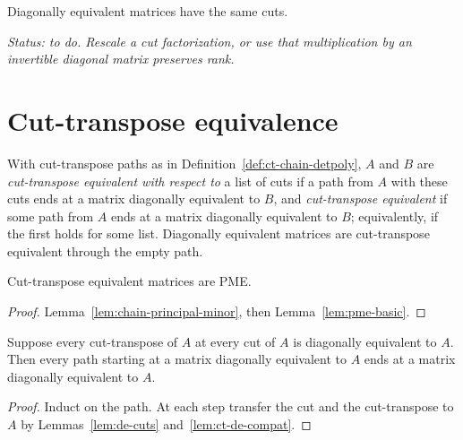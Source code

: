 \begin{lemma}
\label{lem:de-cuts}
\leanok
{}
Diagonally equivalent matrices have the same cuts.
\end{lemma}
\noindent\emph{Status: to do. Rescale a cut factorization, or use that multiplication by an
invertible diagonal matrix preserves rank.}

\section{Cut-transpose equivalence}

\begin{definition}
\label{def:ct-chain}
\leanok
{}
With cut-transpose paths as in Definition~\ref{def:ct-chain-detpoly}, $A$ and $B$ are
\emph{cut-transpose equivalent with respect to} a list of cuts if a path from $A$ with these
cuts ends at a matrix diagonally equivalent to $B$, and \emph{cut-transpose equivalent} if
some path from $A$ ends at a matrix diagonally equivalent to $B$; equivalently, if the first
holds for some list. Diagonally equivalent matrices are cut-transpose equivalent through the
empty path.
\end{definition}

\begin{lemma}
\label{lem:chain-pme}
\leanok
{}
Cut-transpose equivalent matrices are PME.
\end{lemma}
\begin{proof}
\leanok
Lemma~\ref{lem:chain-principal-minor}, then Lemma~\ref{lem:pme-basic}.
\end{proof}

\begin{lemma}
\label{lem:chain-de}
\leanok
{}
Suppose every cut-transpose of $A$ at every cut of $A$ is diagonally equivalent to $A$.
Then every path starting at a matrix diagonally equivalent to $A$ ends at a matrix
diagonally equivalent to $A$.
\end{lemma}
\begin{proof}
\leanok
Induct on the path. At each step transfer the cut and the cut-transpose to $A$ by
Lemmas~\ref{lem:de-cuts} and~\ref{lem:ct-de-compat}.
\end{proof}


